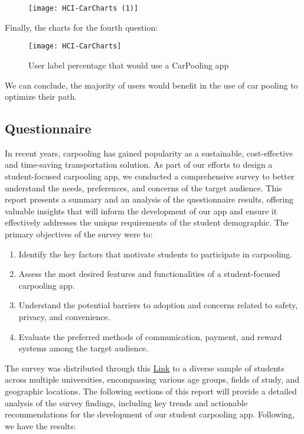 \documentclass{article}
\begin{document}
\begin{figure}[htbp]
  \centering
     \texttt{[image: HCI-CarCharts (1)]}
\end{figure}
\newpage

Finally, the charts for the fourth question:

\begin{figure}[htbp]
  \centering
     \texttt{[image: HCI-CarCharts]}
     \caption{User label percentage that would use a CarPooling app}
\end{figure}
We can conclude, the majority of users would benefit in the use of car pooling to optimize their path.

\subsection{Questionnaire}
\graphicspath{{Doc images/Need Finding/GForm}}
In recent years, carpooling has gained popularity as a sustainable, cost-effective and time-saving transportation solution. As part of our efforts to design a student-focused carpooling app, we conducted a comprehensive survey to better understand the needs, preferences, and concerns of the target audience. This report presents a summary and an analysis of the questionnaire results, offering valuable insights that will inform the development of our app and ensure it effectively addresses the unique requirements of the student demographic. The primary objectives of the survey were to: 

\begin{enumerate}
    \item Identify the key factors that motivate students to participate in carpooling.
    \item Assess the most desired features and functionalities of a student-focused carpooling app.
    \item Understand the potential barriers to adoption and concerns related to safety, privacy, and convenience.
    \item Evaluate the preferred methods of communication, payment, and reward systems among the target audience.
\end{enumerate}
\newpage

The survey was distributed through this \href{https://docs.google.com/forms/d/e/1FAIpQLSfoQUau5RHD3TZP04OesFrpqaL6gogQ5BaRBhBGRepxQMgd8g/viewform?usp=sharing}{Link} to a diverse sample of students across multiple universities, encompassing various age groups, fields of study, and geographic locations. The following sections of this report will provide a detailed analysis of the survey findings, including key trends and actionable recommendations for the development of our student carpooling app. Following, we have the results: \newline \newline
\end{document}
